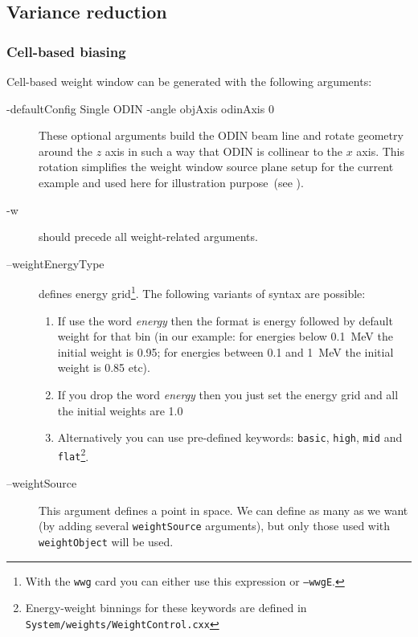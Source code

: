 \subsection{Variance reduction}
\subsubsection{Cell-based biasing}
\label{sec:vr:cell}

Cell-based weight window can be generated with the following arguments:



\begin{description}
\item[-defaultConfig Single ODIN -angle objAxis odinAxis 0] These optional arguments build the ODIN beam line
  and rotate geometry around the $z$ axis in such a way that ODIN is collinear to the $x$ axis.
  This rotation simplifies the weight window source plane setup for the current example and used here for
  illustration purpose~(see ).
\item[-w] should precede all weight-related arguments.
\item[--weightEnergyType] defines energy grid\footnote{With the {\tt wwg} card you can either use this expression or {\tt --wwgE}.}.
  The following variants of syntax are possible:
  \begin{enumerate}
    \item If use the word {\em energy} then the format is energy followed by default weight for that bin
      (in our example: for energies below \SI{0.1}{\mega\electronvolt} the initial weight is \num{0.95};
          for energies between \num{0.1} and \SI{1}{\mega\electronvolt} the initial weight is \num{0.85} etc).
    \item If you drop the word {\em energy} then you just set the energy grid and all the initial weights are 1.0
    \item Alternatively you can use pre-defined keywords:
      {\tt basic}, {\tt high}, {\tt mid} and {\tt flat}\footnote{Energy-weight binnings for these keywords are defined in \tt{System/weights/WeightControl.cxx}}.
    \end{enumerate}
\item[--weightSource] This argument defines a point in space. We can define as many as we want (by adding several {\tt weightSource} arguments),
  but only those used with {\tt weightObject} will be used.

\end{description}
